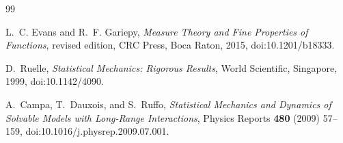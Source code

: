 \documentclass[11pt]{article}
\begin{document}
\begin{thebibliography}{99}

L.~C. Evans and R.~F. Gariepy,
\emph{Measure Theory and Fine Properties of Functions},
revised edition, CRC Press, Boca Raton, 2015,
doi:10.1201/b18333.

D.~Ruelle,
\emph{Statistical Mechanics: Rigorous Results},
World Scientific, Singapore, 1999,
doi:10.1142/4090.

A.~Campa, T.~Dauxois, and S.~Ruffo,
\emph{Statistical Mechanics and Dynamics of Solvable Models with Long-Range
Interactions},
Physics Reports \textbf{480} (2009) 57--159,
doi:10.1016/j.physrep.2009.07.001.

\end{thebibliography}
\end{document}
